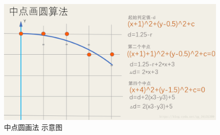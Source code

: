 \documentclass[a4paper,UTF8]{article}
\theoremstyle{definition}
\begin{document}
\begin{figure}[ht]
\centering
\includegraphics[width=13cm]{x3.png}
\caption{中点圆画法 示意图}
\label{x3}
\end{figure}
\end{document}
